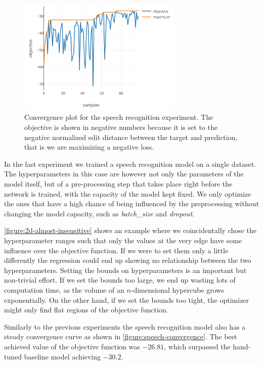 \begin{figure}
	\begin{center}
		\includegraphics[width=0.7\textwidth]{images/speech-convergence.png}
		\caption{Convergence plot for the speech recognition experiment. The objective is shown in negative numbers because it is set to the negative normalized edit distance between the target and prediction, that is we are maximizing a negative loss.}
		\label{figure:speech-convergence}
	\end{center}
\end{figure}

In the last experiment we trained a speech recognition model on a single dataset. The hyperparameters in this case are however not only the parameters of the model itself, but of a pre-processing step that takes place right before the network is trained, with the capacity of the model kept fixed. We only optimize the ones that have a high chance of being influenced by the preprocessing without changing the model capacity, such as \emph{batch\_size} and \emph{dropout}.

\autoref{figure:2d-almost-insensitive} shows an example where we coincidentally chose the hyperparameter ranges such that only the values at the very edge have some influence over the objective function. If we were to set them only a little differently the regression could end up showing no relationship between the two hyperparameters. Setting the bounds on hyperparameters is an important but non-trivial effort. If we set the bounds too large, we end up wasting lots of computation time, as the volume of an $n$-dimensional hypercube grows exponentially. On the other hand, if we set the bounds too tight, the optimizer might only find flat regions of the objective function.

Similarly to the previous experiments the speech recognition model also has a steady convergence curve as shown in \autoref{figure:speech-convergence}. The best achieved value of the objective function was $-26.81$, which surpassed the hand-tuned baseline model achieving $-30.2$.


